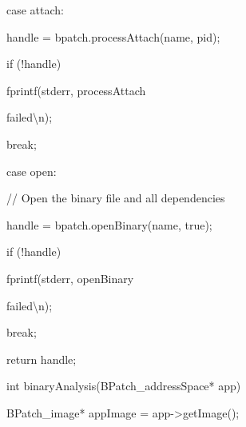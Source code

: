{{{{

case attach:}



{

handle = bpatch.processAttach(name, pid);}



{

if (!handle) { fprintf(stderr, {\textquotedbl}processAttach

failed{\textbackslash}n{\textquotedbl}); }}



{

break;}



{

case open:}



{

// Open the binary file and all dependencies}



{

handle = bpatch.openBinary(name, true);}



{

if (!handle) { fprintf(stderr, {\textquotedbl}openBinary

failed{\textbackslash}n{\textquotedbl}); }}



{

break;}



{

}}





\bigskip



{

return handle;}



{

}}





\bigskip



{

int binaryAnalysis(BPatch_addressSpace* app) {}



{

BPatch_image* appImage = app->getImage();}





}}
